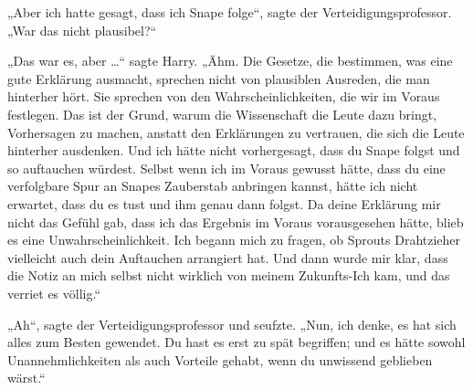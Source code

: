 „Aber ich hatte gesagt, dass ich Snape folge“, sagte der Verteidigungsprofessor.
„War das nicht plausibel?“

„Das war es, aber …“ sagte Harry. „Ähm. Die Gesetze, die bestimmen, was eine gute Erklärung ausmacht, sprechen nicht von plausiblen Ausreden, die man hinterher hört. Sie sprechen von den Wahrscheinlichkeiten, die wir im Voraus festlegen. Das ist der Grund, warum die Wissenschaft die Leute dazu bringt, Vorhersagen zu machen, anstatt den Erklärungen zu vertrauen, die sich die Leute hinterher ausdenken. Und ich hätte nicht vorhergesagt, dass du Snape folgst und so auftauchen würdest. Selbst wenn ich im Voraus gewusst hätte, dass du eine verfolgbare Spur an Snapes Zauberstab anbringen kannst, hätte ich nicht erwartet, dass du es tust und ihm genau dann folgst. Da deine Erklärung mir nicht das Gefühl gab, dass ich das Ergebnis im Voraus vorausgesehen hätte, blieb es eine Unwahrscheinlichkeit. Ich begann mich zu fragen, ob Sprouts Drahtzieher vielleicht auch dein Auftauchen arrangiert hat. Und dann wurde mir klar, dass die Notiz an mich selbst nicht wirklich von meinem Zukunfts-Ich kam, und das verriet es völlig.“

„Ah“, sagte der Verteidigungsprofessor und seufzte.
„Nun, ich denke, es hat sich alles zum Besten gewendet. Du hast es erst zu spät begriffen; und es hätte sowohl Unannehmlichkeiten als auch Vorteile gehabt, wenn du unwissend geblieben wärst.“

